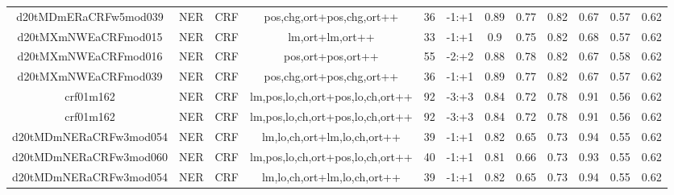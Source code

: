 \documentclass[a4paper]{article}
\begin{document}
\begin{landscape}
\begin{center}
\begin{tabular}{ |c|c|c|c|c|c|c|c|c|c|c|c|}
 	
 
 	
 		
 		\small{ d20tMDmERaCRFw5mod039 } & NER & CRF & pos,chg,ort+pos,chg,ort++  &  36 &  -1:+1  &  0.89 & 0.77 & 0.82  &  0.67 & 0.57 & 0.62 \\
 		

 	
 
 	
 		
 		\small{ d20tMXmNWEaCRFmod015 } & NER & CRF & lm,ort+lm,ort++  &  33 &  -1:+1  &  0.9 & 0.75 & 0.82  &  0.68 & 0.57 & 0.62 \\
 		

 	
 
 	
 		
 		\small{ d20tMXmNWEaCRFmod016 } & NER & CRF & pos,ort+pos,ort++  &  55 &  -2:+2  &  0.88 & 0.78 & 0.82  &  0.67 & 0.58 & 0.62 \\
 		

 	
 
 	
 		
 		\small{ d20tMXmNWEaCRFmod039 } & NER & CRF & pos,chg,ort+pos,chg,ort++  &  36 &  -1:+1  &  0.89 & 0.77 & 0.82  &  0.67 & 0.57 & 0.62 \\
 		

 	
 
 	
 		
 		\small{ crf01m162 } & NER & CRF & lm,pos,lo,ch,ort+pos,lo,ch,ort++  &  92 &  -3:+3  &  0.84 & 0.72 & 0.78  &  0.91 & 0.56 & 0.62 \\
 		

 	
 
 	
 		
 		\small{ crf01m162 } & NER & CRF & lm,pos,lo,ch,ort+pos,lo,ch,ort++  &  92 &  -3:+3  &  0.84 & 0.72 & 0.78  &  0.91 & 0.56 & 0.62 \\
 		

 	
 
 	
 		
 		\small{ d20tMDmNERaCRFw3mod054 } & NER & CRF & lm,lo,ch,ort+lm,lo,ch,ort++  &  39 &  -1:+1  &  0.82 & 0.65 & 0.73  &  0.94 & 0.55 & 0.62 \\
 		

 	
 
 	
 		
 		\small{ d20tMDmNERaCRFw3mod060 } & NER & CRF & lm,pos,lo,ch,ort+pos,lo,ch,ort++  &  40 &  -1:+1  &  0.81 & 0.66 & 0.73  &  0.93 & 0.55 & 0.62 \\
 		

 	
 
 	
 		
 		\small{ d20tMDmNERaCRFw3mod054 } & NER & CRF & lm,lo,ch,ort+lm,lo,ch,ort++  &  39 &  -1:+1  &  0.82 & 0.65 & 0.73  &  0.94 & 0.55 & 0.62 \\
 		


\end{tabular}
\end{center}
\end{landscape}
\end{document}
